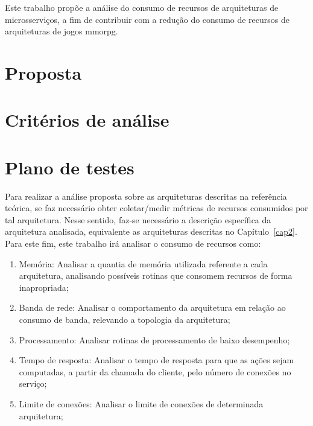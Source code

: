 Este trabalho propõe a análise do consumo de recursos de arquiteturas de microsserviços, a fim de contribuir com a redução do consumo de recursos de arquiteturas de jogos \ac{mmorpg}.


\section{Proposta}


\section{Critérios de análise}


\section {Plano de testes}

Para realizar a análise proposta sobre as arquiteturas descritas na referência teórica, se faz necessário obter coletar/medir métricas de recursos consumidos por tal arquitetura.
%
Nesse sentido, faz-se necessário a descrição específica da arquitetura analisada, equivalente as arquiteturas descritas no Capítulo~\ref{cap2}.
%
Para este fim, este trabalho irá analisar o consumo de recursos como:

\begin{enumerate}
  \item{Memória: Analisar a quantia de memória utilizada referente a cada arquitetura, analisando possíveis rotinas que consomem recursos de forma inapropriada;}
  \item{Banda de rede: Analisar o comportamento da arquitetura em relação ao consumo de banda, relevando a topologia da arquitetura;}
  \item{Processamento: Analisar rotinas de processamento de baixo desempenho;}
  \item{Tempo de resposta: Analisar o tempo de resposta para que as ações sejam computadas, a partir da chamada do cliente, pelo número de conexões no serviço;}
  \item{Limite de conexões: Analisar o limite de conexões de determinada arquitetura;}
\end{enumerate}

